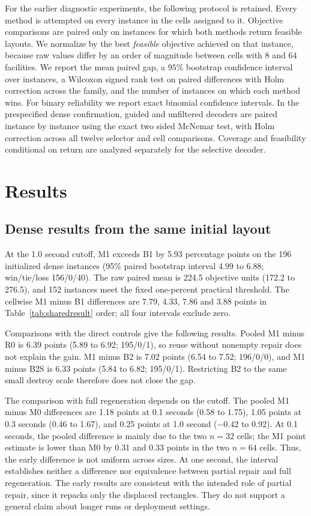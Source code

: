 \documentclass[preprint,12pt,authoryear]{elsarticle}
\begin{document}
For the earlier diagnostic experiments, the following protocol is retained.
Every method is attempted on every instance in the cells assigned to it.
Objective comparisons are paired only on instances for which both methods return
feasible layouts. We normalize by the best \emph{feasible} objective achieved on
that instance, because raw values differ by an order of magnitude between cells
with $8$ and $64$ facilities. We report the mean paired gap, a $95\%$
bootstrap confidence interval over instances, a Wilcoxon signed rank test on
paired differences with Holm correction across the family, and the number of
instances on which each method wins. For binary reliability we report exact
binomial confidence intervals. In the prespecified dense confirmation, guided and
unfiltered decoders are paired instance by instance using the exact two sided
McNemar test, with Holm correction across all twelve selector and cell comparisons.
Coverage and feasibility conditional on return are analyzed separately for the
selective decoder.

\section{Results}
\label{sec:results}

\subsection{Dense results from the same initial layout}
\label{sec:sharedresult}
At the 1.0 second cutoff, M1 exceeds B1 by 5.93 percentage points on the
196 initialized dense instances (95\% paired bootstrap interval 4.99 to 6.88;
win/tie/loss 156/0/40). The raw paired mean is 224.5 objective units (172.2 to
276.5), and 152 instances meet the fixed one-percent practical threshold.
The cellwise M1 minus B1 differences are 7.79, 4.33, 7.86 and 3.88 points in
Table~\ref{tab:sharedresult} order; all four intervals exclude zero.

Comparisons with the direct controls give the following results. Pooled M1 minus R0 is 6.39 points
(5.89 to 6.92; 195/0/1), so reuse without nonempty repair does not explain the
gain. M1 minus B2 is 7.02 points (6.54 to 7.52; 196/0/0), and M1 minus B2S is
6.33 points (5.84 to 6.82; 195/0/1). Restricting B2 to the same small destroy
scale therefore does not close the gap.

The comparison with full regeneration depends on the cutoff. The pooled M1
minus M0 differences are 1.18 points at 0.1 seconds (0.58 to 1.75), 1.05 points
at 0.3 seconds (0.46 to 1.67), and 0.25 points at 1.0 second ($-0.42$ to 0.92).
At 0.1 seconds, the pooled difference is mainly due to the two $n=32$ cells;
the M1 point estimate is lower than M0 by 0.31 and 0.33 points in the two $n=64$
cells. Thus, the early difference is not uniform across sizes. At one second,
the interval establishes neither a difference nor equivalence between partial
repair and full regeneration. The early results are consistent with the intended
role of partial repair, since it repacks only the displaced rectangles. They do
not support a general claim about longer runs or deployment settings.
\end{document}
